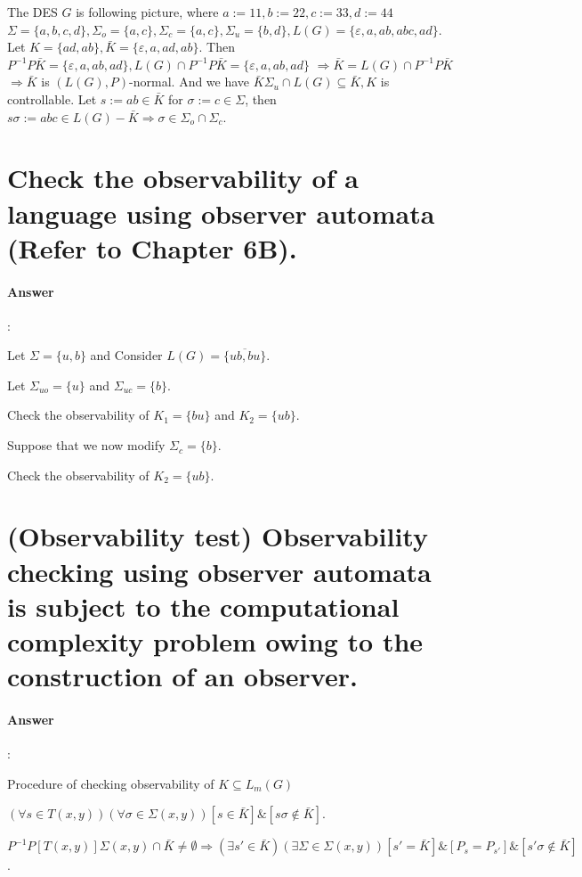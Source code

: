 \documentclass{article}
\begin{document}
The DES $G$ is following picture, where $a:=11, b:=22, c:=33, d:=44$ $\Sigma=\{a, b, c, d\}, \Sigma_o=\{a, c\}, \Sigma_c=\{a, c\}, \Sigma_u=\{b, d\}, L(G)=\{\varepsilon, a, a b, a b c, a d\}$. Let $K=\{a d, a b\}, \bar{K}=\{\varepsilon, a, a d, a b\}$.
Then $P^{-1} P \bar{K}=\{\varepsilon, a, a b, a d\}, L(G) \cap P^{-1} P \bar{K}=\{\varepsilon, a, a b, a d\}$
$\Longrightarrow \bar{K}=L(G) \cap P^{-1} P \bar{K}$
$\Longrightarrow \bar{K}$ is $(L(G), P)$-normal.
And we have $\bar{K} \Sigma_u \cap L(G) \subseteq \bar{K}, K$ is controllable. Let $s:=a b \in \bar{K}$ for $\sigma:=c \in \Sigma$, then $s \sigma:=a b c \in L(G)-\bar{K} \Longrightarrow \sigma \in \Sigma_o \cap \Sigma_c$.

\section{Check the observability of a language using observer automata (Refer to Chapter 6B).}

\paragraph{Answer}:

Let $\Sigma = \{u,b\}$ and Consider $L(G) = \overline{\{ub, bu\}}$.

Let $\Sigma_{uo} = \{u\}$ and $\Sigma_{uc} = \{b\}$.

Check the observability of $K_1 = \{bu\}$ and $K_2 = \{ub\}$.

Suppose that we now modify $\Sigma_c = \{b\}$.

Check the observability of $K_2 = \{ub\}$.

\section{(Observability test) Observability checking using observer automata is subject to the computational complexity problem owing to the construction of an observer.}

\paragraph{Answer}:

Procedure of checking observability of $K \subseteq L_m(G)$

$(\forall s \in T(x, y)) (\forall \sigma \in \Sigma(x, y)) [s \in \bar{K}] \& [s\sigma \notin \bar{K}] $.

$P^{-1}P[T(x,y)] \Sigma(x, y) \cap \bar{K} \neq \emptyset \Rightarrow (\exists s\prime \in \bar{K}) (\exists \Sigma \in \Sigma(x, y)) [s\prime =\bar{K}] \& [P_s = P_{s\prime}] \& [s\prime \sigma \notin \bar{K}]$.
\end{document}
